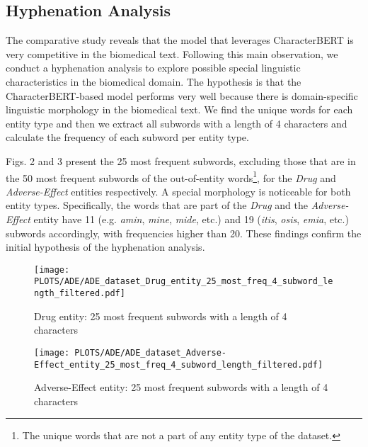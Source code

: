 \documentclass[runningheads]{llncs}
\begin{document}
\subsection{Hyphenation Analysis}
\vspace{-2mm}
The comparative study reveals that the model that leverages CharacterBERT is very competitive in the biomedical text. Following this main observation, we conduct a hyphenation analysis to explore possible special linguistic characteristics in the biomedical domain. The hypothesis is that the CharacterBERT-based model performs very well because there is domain-specific linguistic morphology in the biomedical text. We find the unique words for each entity type and then we extract all subwords with a length of 4 characters and calculate the frequency of each subword per entity type.

Figs. 2 and 3 present the 25 most frequent subwords, excluding those that are in the 50 most frequent subwords of the out-of-entity words\footnote{The unique words that are not a part of any entity type of the dataset.}, for the \textit{Drug} and \textit{Adverse-Effect} entities respectively. A special morphology is noticeable for both entity types. Specifically, the words that are part of the \textit{Drug} and the \textit{Adverse-Effect} entity have 11 (e.g. \textit{amin}, \textit{mine}, \textit{mide}, etc.) and 19 (\textit{itis}, \textit{osis}, \textit{emia}, etc.) subwords accordingly, with frequencies higher than 20. These findings confirm the initial hypothesis of the hyphenation analysis.

\begin{figure}[!h]
\vspace{-6mm}
  \centering
  \texttt{[image: PLOTS/ADE/ADE\_dataset\_Drug\_entity\_25\_most\_freq\_4\_subword\_length\_filtered.pdf]}
  \vspace{-6mm}
  \caption{Drug entity: 25 most frequent subwords with a length of 4 characters}
\end{figure}

\begin{figure}[!h]
  \vspace{-4mm}
  \centering
  \texttt{[image: PLOTS/ADE/ADE\_dataset\_Adverse-Effect\_entity\_25\_most\_freq\_4\_subword\_length\_filtered.pdf]}
  \vspace{-6mm}
  \caption{Adverse-Effect entity: 25 most frequent subwords with a length of 4 characters}
  \vspace{-6mm}
\end{figure}
\end{document}
